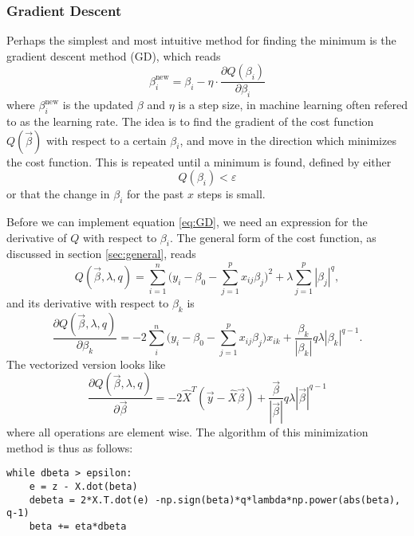 \subsubsection{Gradient Descent} \label{sec:gd}
Perhaps the simplest and most intuitive method for finding the minimum is the gradient descent method (GD), which reads
\begin{equation}
\label{eq:GD}
\beta_i^{\text{new}}=\beta_i - \eta\cdot\frac{\partial Q(\beta_i)}{\partial\beta_i}
\end{equation}
where $\beta_i^{\text{new}}$ is the updated $\beta$ and $\eta$ is a step size, in machine learning often refered to as the learning rate. The idea is to find the gradient of the cost function $Q(\vec{\beta})$ with respect to a certain $\beta_i$, and move in the direction which minimizes the cost function. This is repeated until a minimum is found, defined by either
\begin{equation}
Q(\beta_i)<\varepsilon
\end{equation}
or that the change in $\beta_i$ for the past $x$ steps is small. 
\par 
\vspace{3mm}

Before we can implement equation \eqref{eq:GD}, we need an expression for the derivative of $Q$ with respect to $\beta_i$. The general form of the cost function, as discussed in section \ref{sec:general}, reads
\begin{equation}
Q(\vec{\beta},\lambda,q)=\sum_{i=1}^{n}\Big(y_i-\beta_0-\sum_{j=1}^px_{ij}\beta_j\Big)^2+\lambda\sum_{j=1}^p|\beta_j|^q,
\label{eq:cost_gen}
\end{equation}
and its derivative with respect to $\beta_k$ is
\begin{equation}
\frac{\partial Q(\vec{\beta},\lambda,q)}{\partial\beta_k}=-2\sum_i^n\Big(y_i-\beta_0-\sum_{j=1}^px_{ij}\beta_j\Big)x_{ik}+\frac{\beta_k}{|\beta_k|}q\lambda|\beta_k|^{q-1}.
\label{eq:der_cost_gen}
\end{equation}
The vectorized version looks like
\begin{equation}
\frac{\partial Q(\vec{\beta},\lambda,q)}{\partial\vec{\beta}}=-2\hat{X}^T(\vec{y}-\hat{X}\vec{\beta})+\frac{\vec{\beta}}{|\vec{\beta}|}q\lambda|\vec{\beta}|^{q-1}
\label{eq:der_cost_gen_vec}
\end{equation}
where all operations are element wise. The algorithm of this minimization method is thus as follows:

\lstset{basicstyle=\scriptsize}
\begin{lstlisting}
while dbeta > epsilon:
	e = z - X.dot(beta)
    debeta = 2*X.T.dot(e) -np.sign(beta)*q*lambda*np.power(abs(beta), q-1)
    beta += eta*dbeta
\end{lstlisting}

